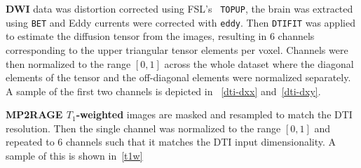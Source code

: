 \textbf{DWI} data was distortion corrected using FSL's~\autocite{smith_advances_2004} \texttt{TOPUP}, the brain was extracted using \texttt{BET} and Eddy currents were corrected with \texttt{eddy}.
Then \texttt{DTIFIT} was applied to estimate the diffusion tensor from the images, resulting in 6 channels corresponding to the upper triangular tensor elements per voxel.
Channels were then normalized to the range $[0, 1]$ across the whole dataset where the diagonal elements of the tensor and the off-diagonal elements were normalized separately.
A sample of the first two channels is depicted in ~\ref{dti-dxx} and~\ref{dti-dxy}.

\textbf{MP2RAGE $T_1$-weighted} images are masked and resampled to match the DTI resolution.
Then the single channel was normalized to the range $[0, 1]$ and repeated to 6 channels such that it matches the DTI input dimensionality.
A sample of this is shown in~\ref{t1w}


